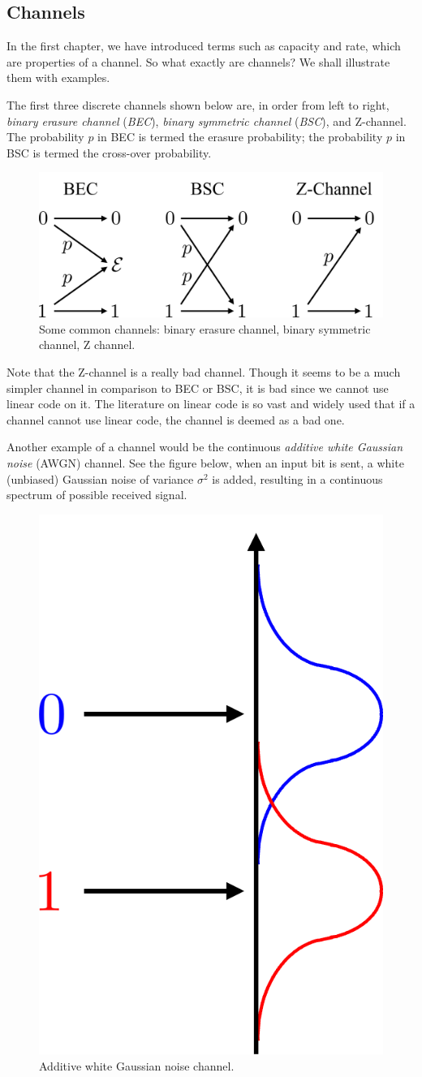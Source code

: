 \subsection{Channels}
In the first chapter, we have introduced terms such as capacity and rate, which are properties of a channel. So what exactly are channels? We shall illustrate them with examples.

The first three discrete channels shown below are, in order from left to right, \textit{binary erasure channel} (\textit{BEC}), \textit{binary symmetric channel} (\textit{BSC}), and Z-channel. The probability $p$ in BEC is termed the erasure probability; the probability $p$ in BSC is termed the cross-over probability.
\begin{figure}[H]
    \centering
    \includegraphics[width=0.5\linewidth]{figures/w2_discrete_channels.png}
    \caption{Some common channels: binary erasure channel, binary symmetric channel, Z channel.}
\end{figure}
Note that the Z-channel is a really bad channel. Though it seems to be a much simpler channel in comparison to BEC or BSC, it is bad since we cannot use linear code on it. The literature on linear code is so vast and widely used that if a channel cannot use linear code, the channel is deemed as a bad one.

Another example of a channel would be the continuous \textit{additive white Gaussian noise} (AWGN) channel. See the figure below, when an input bit is sent, a white (unbiased) Gaussian noise of variance $\sigma^2$ is added, resulting in a continuous spectrum of possible received signal.

\begin{figure}[H]
    \centering
    \includegraphics[width=0.15\linewidth]{figures/w2_AWGN.png}
    \caption{Additive white Gaussian noise channel.}
\end{figure}

